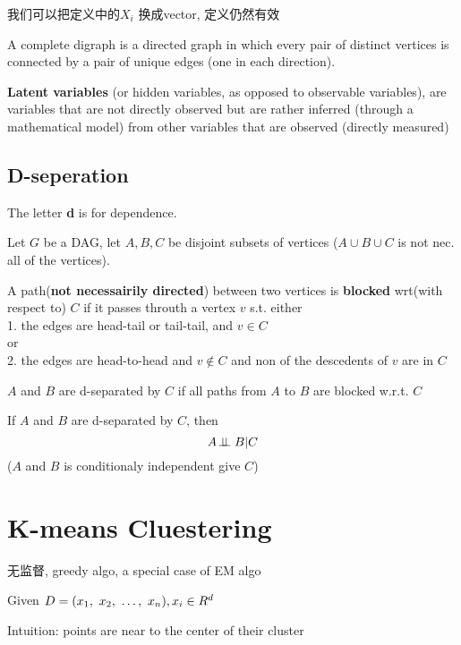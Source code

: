\documentclass{article}
\begin{document}
\begin{remark}
我们可以把定义中的$X_i$ 换成vector, 定义仍然有效
\end{remark}

A complete digraph is a directed graph in which every pair of distinct vertices is connected by a pair of unique edges (one in each direction).

\textbf{Latent variables} (or hidden variables, as opposed to observable variables), are variables that are not directly observed 
but are rather inferred (through a mathematical model) from other variables that are observed (directly measured)

\subsection{D-seperation}
The letter \textbf{d} is for dependence.

Let $G$ be a DAG, let $A,B,C$ be disjoint subsets of vertices ($A \cup B \cup C$ is not nec. all of the vertices).

\begin{definition}
A path(\textbf{not necessairily directed}) between two vertices is \textbf{blocked} wrt(with respect to) $C$ if 
it passes throuth a vertex $v$ s.t. either\\
1. the edges are head-tail or tail-tail, and $v \in C$\\
or\\
2. the edges are head-to-head and $v \notin C$ and non of the descedents of $v$ are in $C$
\end{definition}

\begin{definition}
$A$ and $B$ are d-separated by $C$ if all paths from $A$ to $B$ are blocked w.r.t. $C$
\end{definition}

\begin{theorem}
If $A$ and $B$ are d-separated by $C$, then 
$$A \!\perp\!\!\!\perp B | C$$
($A$ and $B$ is conditionaly independent give $C$)
\end{theorem}

\section{K-means Cluestering}
无监督, greedy algo, a special case of EM algo

Given $D = (x_1,~x_2,~\ldots,~x_n), x_i \in R^d$

Intuition: points are near to the center of their cluster
\end{document}
